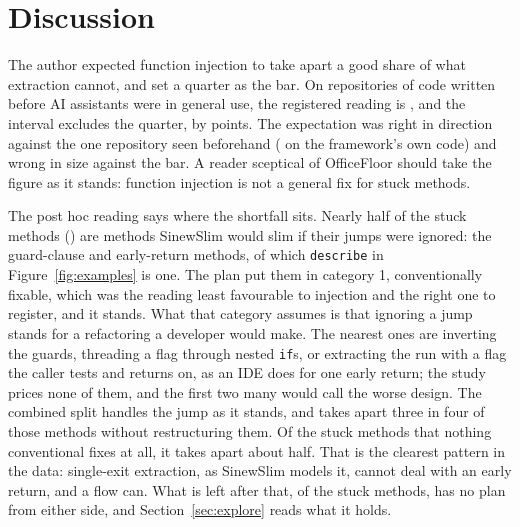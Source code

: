 \documentclass[11pt,a4paper]{article}
\newcommand{\sig}[1]{\texttt{#1}}
\begin{document}
\section{Discussion}

The author expected function injection to take apart a good share of what
extraction cannot, and set a quarter as the bar. On \nUsable{} repositories
of code written before AI assistants were in general use, the registered
reading is \popCatThreeC{}, and the interval excludes the quarter, by
\hOneBarGap{} points. The expectation was right in direction against the one
repository seen beforehand (\priorCatThreeShare{} on the framework's own
code) and wrong in size against the bar. A reader sceptical of OfficeFloor
should take the figure as it stands: function injection is not a general fix
for stuck methods.

The post hoc reading says where the shortfall sits. Nearly half of the stuck
methods (\catOneShare{}) are methods SinewSlim would slim if their jumps were
ignored: the guard-clause and early-return methods, of which \sig{describe}
in Figure~\ref{fig:examples} is one. The plan put them in category 1,
conventionally fixable, which was the reading least favourable to injection
and the right one to register, and it stands. What that category assumes is
that ignoring a jump stands for a refactoring a developer would make. The
nearest ones are inverting the guards, threading a flag through nested
\sig{if}s, or extracting the run with a flag the caller tests and returns on,
as an IDE does for one early return; the study prices none of them, and the
first two many would call the worse design. The combined split handles the
jump as it stands, and takes apart three in four of those methods without
restructuring them. Of the stuck methods that nothing conventional fixes at
all, it takes apart about half. That is the clearest pattern in the data:
single-exit extraction, as SinewSlim models it, cannot deal with an early
return, and a flow can. What is left after that, \catFourCShare{} of the
stuck methods, has no plan from either side, and Section~\ref{sec:explore}
reads what it holds.
\end{document}
